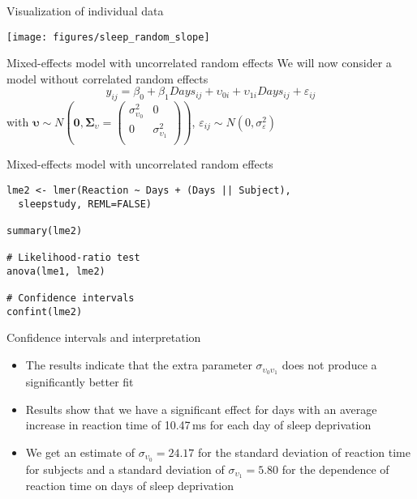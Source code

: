 \documentclass{beamer}
\newcommand{\gvect}[1]{\boldsymbol{#1}}
\newcommand{\gmat}[1]{\boldsymbol{#1}}
\begin{document}
\begin{frame}{Visualization of individual data}
  \begin{center}
      \texttt{[image: figures/sleep\_random\_slope]}
  \end{center}
\end{frame}


\begin{frame}[fragile]{Mixed-effects model with uncorrelated random effects}
  We will now consider a model without correlated random effects
  \[
    y_{ij} = \beta_0 + \beta_1 Days_{ij} + \upsilon_{0i} + \upsilon_{1i} Days_{ij} +
    \varepsilon_{ij}
  \]
with $\gvect{\upsilon} \sim N\left(\gvect{0}, \gmat{\Sigma}_{\upsilon} = 
    \begin{pmatrix}
      \sigma^2_{\upsilon_0} & 0 \\
      0 & \sigma^2_{\upsilon_1} \\
    \end{pmatrix}\right)$,
  $\varepsilon_{ij} \sim N(0, \sigma_{\varepsilon}^2)$ 
\end{frame}

{

\begin{frame}[fragile]{Mixed-effects model with uncorrelated random effects}
  \begin{lstlisting}
lme2 <- lmer(Reaction ~ Days + (Days || Subject),
  sleepstudy, REML=FALSE)

summary(lme2)

# Likelihood-ratio test
anova(lme1, lme2)

# Confidence intervals
confint(lme2)
  \end{lstlisting}
\end{frame}

}

\begin{frame}{Confidence intervals and interpretation}
  \begin{itemize}
    \item The results indicate that the extra parameter
      $\sigma_{\upsilon_0\upsilon_1}$ does not produce a significantly
      better fit
    \item Results show that we have a significant effect for days with an
  average increase in reaction time of 10.47\,ms for each day of sleep
  deprivation
    \item We get an estimate of $\sigma_{\upsilon_0} = 24.17$ for the
      standard deviation of reaction time for subjects and a standard
      deviation of $\sigma_{\upsilon_1} = 5.80$ for the dependence of
      reaction time on days of sleep deprivation
  \end{itemize}
\end{frame}
\end{document}
